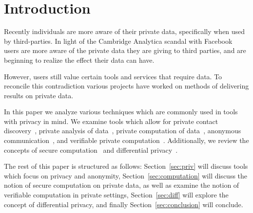 \section{Introduction} \label{sec:intro}
Recently individuals are more aware of their private data, specifically when
used by third-parties. In light of the Cambridge Analytica scandal with
Facebook~\cite{granville_2018, welch_2018} users are more aware of the private
data they are giving to third parties, and are beginning to realize the effect
their data can have.

However, users still value certain tools and services that require data. To
reconcile this contradiction various projects have worked on methods of
delivering results on private data.

In this paper we analyze various techniques which are commonly used in tools
with privacy in mind. We examine tools which allow for private contact
discovery~\cite{demmler2018pir, borisov2015dp5}, private analysis of
data~\cite{erlingsson2014rappor}, private computation of
data~\cite{bogetoft2009secure}, anonymous
communication~\cite{wolinsky2012dissent}, and verifiable private
computation~\cite{ben2013snarks, parno2013pinocchio}. Additionally, we review
the concepts of secure computation~\cite{yao1982protocols, lindell2005secure}
and differential privacy~\cite{dwork2008differential}.

The rest of this paper is structured as follows: Section~\ref{sec:priv} will
discuss tools which focus on privacy and anonymity,
Section~\ref{sec:computation} will discuss the notion of secure computation on
private data, as well as examine the notion of verifiable computation in private
settings, Section~\ref{sec:diff} will explore the concept of differential
privacy, and finally Section~\ref{sec:conclusion} will conclude.